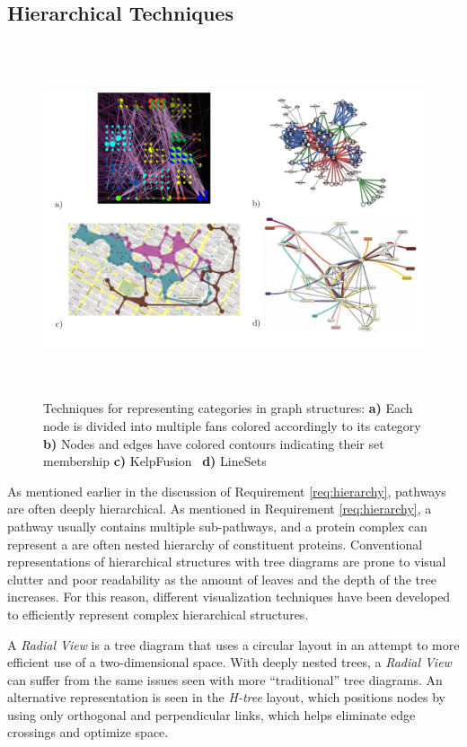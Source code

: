 \documentclass[review,journal]{vgtc}         %
\begin{document}
\subsection{Hierarchical Techniques}

\begin{figure}[th!]
  \centering
  \includegraphics[height=4.1in]{figures/set}
  \caption{Techniques for representing categories in graph structures: \textbf{a)} Each node is divided into multiple fans colored accordingly to its category \textbf{b)} Nodes and edges have colored contours indicating their set membership \textbf{c)} KelpFusion~\cite{meulemans2013kelpfusion} \textbf{d)} LineSets~\cite{linesets}}
  \label{fig:tree}
\end{figure}   

As mentioned earlier in the discussion of Requirement \ref{req:hierarchy}, pathways are often deeply hierarchical. As mentioned in Requirement \ref{req:hierarchy}, a pathway usually contains multiple sub-pathways, and a protein complex can represent a are often nested hierarchy of constituent proteins. Conventional representations of hierarchical structures with tree diagrams are prone to visual clutter and poor readability as the amount of leaves and the depth of the tree increases. For this reason, different visualization techniques have been developed to efficiently represent complex hierarchical structures.

A \textit{Radial View} is a tree diagram that uses a circular layout in an attempt to more efficient use of a two-dimensional space. With deeply nested trees, a \emph{Radial View} can suffer from the same issues seen with more ``traditional'' tree diagrams. An alternative representation is seen in the \textit{H-tree} layout, which positions nodes by using only orthogonal and perpendicular links, which helps eliminate edge crossings and optimize space. 
\end{document}
